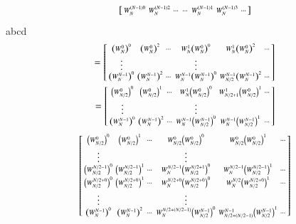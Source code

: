 \documentclass[journal,12pt,twocolumn]{IEEEtran}
\renewcommand\thesection{\arabic{section}}
\begin{document}
\begin{enumerate}[label=\arabic*.,ref=\thesection.\theenumi]
\begin{align}
\begin{bsmallmatrix}
		W_{N}^{(N-1)0}	&	W_{N}^{(N-1)2}	&	\cdots	&	\cdots	&	W_{N}^{(N-1)1}	&	W_{N}^{(N-1)3}	& \cdots
	\end{bsmallmatrix}
\end{align}
abcd\\
\begin{align}
	=\begin{bsmallmatrix}
		\left(W_{N}^{0}\right)^{0}	&	\left(W_{N}^{0}\right)^{2}	&	\cdots	&	W_{N}^1\left(W_{N}^{0}\right)^{0}	&	W_{N}^1\left(W_{N}^{0}\right)^{2}	&	\cdots\\
		\vdots	&&& \vdots\\
		\left(W_{N}^{N-1}\right)^{0}	&	\left(W_{N}^{N-1}\right)^{2}	&	\cdots	&	W_{N}^{N-1}\left(W_{N}^{N-1}\right)^{0}	&	W_{N/2}^{N-1}\left(W_{N}^{N-1}\right)^{2}	&	\cdots\\
	\end{bsmallmatrix}\\
	=\begin{bsmallmatrix}
		\left(W_{N/2}^{0}\right)^{0}	&	\left(W_{N/2}^{0}\right)^{1}	&	\cdots	&	W_{N}^1\left(W_{N/2}^{0}\right)^{0}	&	W_{N/2+1}^1\left(W_{N/2}^{0}\right)^{1}	&	\cdots\\
		\vdots	&&& \vdots\\
		\left(W_{N}^{N-1}\right)^{0}	&	\left(W_{N}^{N-1}\right)^{2}	&	\cdots	&	W_{N}^{N-1}\left(W_{N/2}^{N-1}\right)^{0}	&	W_{N}^{N-1}\left(W_{N/2}^{N-1}\right)^{1}	&	\cdots		
	\end{bsmallmatrix}
\end{align}
\begin{align}
	\begin{bsmallmatrix}
		\left(W_{N/2}^{0}\right)^{0}	&	\left(W_{N/2}^{0}\right)^{1}	&	\cdots	&	W_{N/2}^0\left(W_{N/2}^{0}\right)^{0}	&	W_{N/2}^0\left(W_{N/2}^{0}\right)^{1}	&	\cdots\\
		\vdots	&&& \vdots\\
		\left(W_{N/2}^{N/2 - 1}\right)^{0}	&	\left(W_{N/2}^{N/2 - 1}\right)^{1}	&	\cdots	&	W_{N}^{N/2-1}\left(W_{N/2}^{N/2 + 1}\right)^{0}	&	W_{N}^{N/2-1}\left(W_{N/2}^{N/2 -1}\right)^{1}	&	\cdots\\
		\left(W_{N/2}^{N/2 + 0}\right)^{0}	&	\left(W_{N/2}^{N/2 + 0}\right)^{1}	&	\cdots	&	W_{N}^{N/2 + 0}\left(W_{N/2}^{N/2 + 0}\right)^{0}	&	W_{N}^{N/2}\left(W_{N/2}^{N/2+0}\right)^{1}	&	\cdots\\
		\vdots	&&& \vdots\\
		\left(W_{N}^{N-1}\right)^{0}	&	\left(W_{N}^{N-1}\right)^{2}	&	\cdots	&	W_{N}^{N/2 + (N/2-1)}\left(W_{N/2}^{N-1}\right)^{0}	&	W_{N/2 + (N/2-1)}^{N-1}\left(W_{N/2}^{N-1}\right)^{1}	&	\cdots
	\end{bsmallmatrix}
\end{align}
\begin{align}

\end{align}
\end{enumerate}
\end{document}
